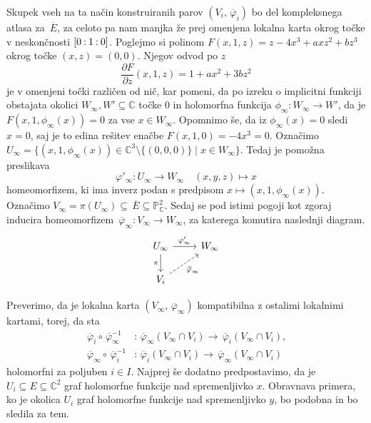 \documentclass[mat1]{fmfdelo}
\numberwithin{equation}{section}
\newcommand{\C}{\mathbb C}
\newcommand{\PC}{\mathbb{P}^2_\C}
\newcommand{\inv}{^{-1}}
\newcommand{\pcoor}[1]{%
\begingroup\lccode`~=`: \lowercase{\endgroup
\edef~}{\mathbin{\mathchar\the\mathcode`:}\nobreak}%
\left[%
\begingroup
\mathcode`:=\string"8000
#1%
\endgroup
\right]%
}
\newcommand{\pdv}[2][]{\frac{\partial#1}{\partial#2}}
\newcommand{\olsi}[1]{\,\overline{\!{#1}}} %
\theoremstyle{definition}
\begin{document}
Skupek vseh na ta način konstruiranih parov $(V_i, \olsi{\varphi}_i)$ bo del kompleksnega atlasa za $\olsi{E}$, za celoto pa nam manjka že prej omenjena lokalna karta okrog točke v neskončnosti $\pcoor{0 : 1 : 0}$. Poglejmo si polinom $F(x, 1, z) = z - 4x^3 + axz^2 + bz^3$ okrog točke $(x,z) = (0,0)$. Njegov odvod po $z$ 
\[
    \pdv[F]{z}(x,1,z) = 1 + ax^2 + 3bz^2
\]
je v omenjeni točki različen od nič, kar pomeni, da po izreku o implicitni funkciji obstajata okolici $W_\infty, W' \subseteq \C$ točke $0$ in holomorfna funkcija $\phi_\infty : W_\infty \to W'$, da je $F(x, 1, \phi_\infty(x)) = 0$ za vse $x \in W_\infty$. Opomnimo še, da iz $\phi_\infty(x) = 0$ sledi $x = 0$, saj je to edina rešitev enačbe $F(x, 1, 0) = -4x^3 = 0$. Označimo $U_\infty = \{(x, 1, \phi_\infty(x)) \in \C^3 \setminus \{(0,0,0)\}\mid x \in W_\infty\}$. Tedaj je pomožna preslikava 
\[
    \varphi'_\infty : U_\infty \to W_\infty \quad (x,y,z) \mapsto x
\]
homeomorfizem, ki ima inverz podan s predpisom $x \mapsto (x,1,\phi_\infty(x))$. Označimo $V_\infty = \pi(U_\infty) \subseteq \olsi{E} \subseteq \PC$. Sedaj se pod istimi pogoji kot zgoraj inducira homeomorfizem $\olsi{\varphi}_\infty : V_\infty \to W_\infty$, za katerega komutira naslednji diagram.
%
\begin{equation}
    \label{projektivna karta v inf diagram}  
    \begin{tikzcd}
	{U_\infty} & {W_\infty} \\
	{V_i}
	\arrow["{\varphi'_\infty}", from=1-1, to=1-2]
	\arrow["\pi"', from=1-1, to=2-1]
	\arrow["{\olsi{\varphi}_\infty}"', dashed, from=2-1, to=1-2]
    \end{tikzcd}
\end{equation}

Preverimo, da je lokalna karta $(V_\infty, \olsi{\varphi}_\infty)$ kompatibilna z ostalimi lokalnimi kartami, torej, da sta
\begin{align*}
    \olsi{\varphi}_i \circ \olsi{\varphi}_\infty\inv &: \olsi{\varphi}_\infty(V_\infty \cap V_i) \to \olsi{\varphi}_i(V_\infty \cap V_i), \\
    \olsi{\varphi}_\infty \circ \olsi{\varphi}_i\inv &: \olsi{\varphi}_i(V_\infty \cap V_i) \to \olsi{\varphi}_\infty(V_\infty \cap V_i)
\end{align*}
holomorfni za poljuben $i \in I$. Najprej še dodatno predpostavimo, da je $U_i \subseteq E \subseteq \C^2$ graf holomorfne funkcije nad spremenljivko $x$. Obravnava primera, ko je okolica $U_i$ graf holomorfne funkcije nad spremenljivko $y$, bo podobna in bo sledila za tem.
\end{document}
